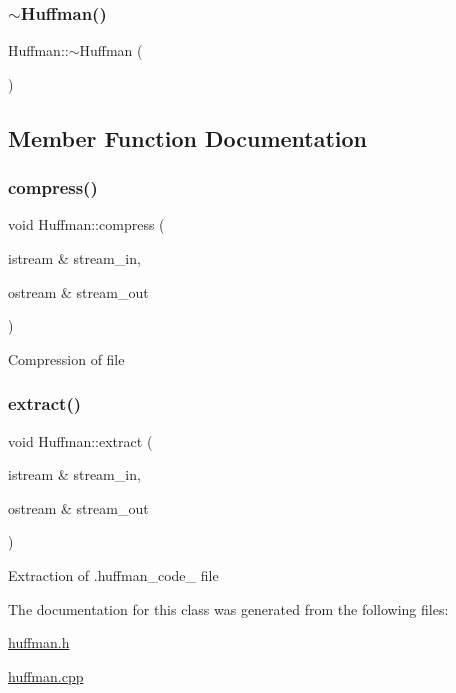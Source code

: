 \subsubsection{\texorpdfstring{$\sim$\+Huffman()}{~Huffman()}}
{\footnotesize\ttfamily Huffman\+::$\sim$\+Huffman (\begin{DoxyParamCaption}{ }\end{DoxyParamCaption})}



\subsection{Member Function Documentation}
\mbox{\label{class_huffman_a692805d2f9f60f0a4663ec027b6f196d}} 
\subsubsection{\texorpdfstring{compress()}{compress()}}
{\footnotesize\ttfamily void Huffman\+::compress (\begin{DoxyParamCaption}\item[{istream \&}]{stream\+\_\+in,  }\item[{ostream \&}]{stream\+\_\+out }\end{DoxyParamCaption})}

Compression of file \mbox{\label{class_huffman_aca6b32706e62035b9dd6d7c9edba745e}} 
\subsubsection{\texorpdfstring{extract()}{extract()}}
{\footnotesize\ttfamily void Huffman\+::extract (\begin{DoxyParamCaption}\item[{istream \&}]{stream\+\_\+in,  }\item[{ostream \&}]{stream\+\_\+out }\end{DoxyParamCaption})}

Extraction of .huffman\+\_\+code\+\_\+ file 

The documentation for this class was generated from the following files\+:\begin{DoxyCompactItemize}
\item 
\hyperlink{huffman_8h}{huffman.\+h}\item 
\hyperlink{huffman_8cpp}{huffman.\+cpp}\end{DoxyCompactItemize}
